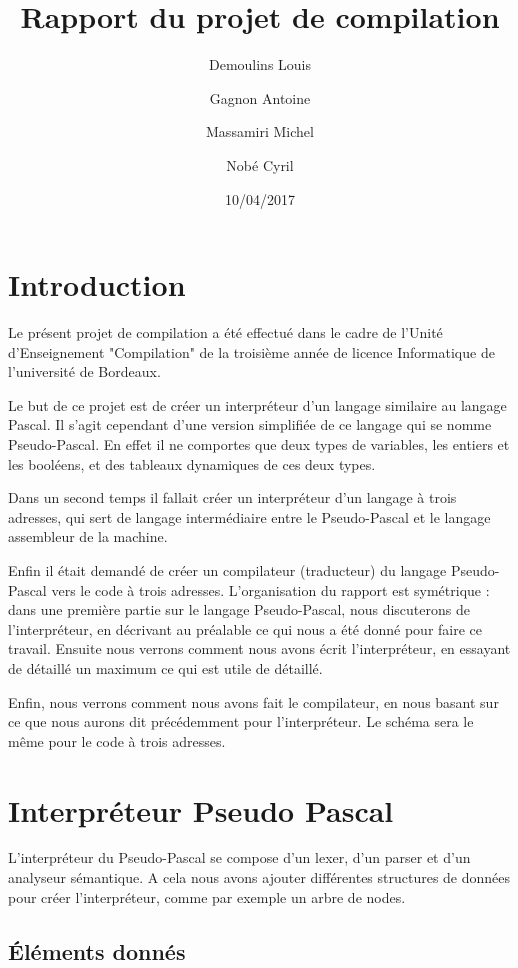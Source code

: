 \documentclass{article}
\title{Rapport du projet de compilation}
\date{10/04/2017}
\author{Demoulins Louis \and Gagnon Antoine \and Massamiri Michel \and Nobé Cyril}
\begin{document}
\maketitle
\newpage

\tableofcontents

\newpage
\section{Introduction}

Le présent projet de compilation a été effectué dans le cadre de l'Unité d'Enseignement "Compilation" de la troisième année de licence Informatique de l'université de Bordeaux.

\medbreak

Le but de ce projet est de créer un interpréteur d'un langage similaire au langage Pascal. Il s'agit cependant d'une version simplifiée de ce langage qui se nomme Pseudo-Pascal.
En effet il ne comportes que deux types de variables, les entiers et les booléens, et des tableaux dynamiques de ces deux types.

Dans un second temps il fallait créer un interpréteur d'un langage à trois adresses, qui sert de langage intermédiaire entre le Pseudo-Pascal et le langage assembleur de la machine.

Enfin il était demandé de créer un compilateur (traducteur) du langage Pseudo-Pascal vers le code à trois adresses.
\bigbreak
L'organisation du rapport est symétrique : dans une première partie sur le langage Pseudo-Pascal, nous discuterons de l'interpréteur, en décrivant au préalable ce qui nous a été donné pour faire ce travail.
Ensuite nous verrons comment nous avons écrit l'interpréteur, en essayant de détaillé un maximum ce qui est utile de détaillé.

Enfin, nous verrons comment nous avons fait le compilateur, en nous basant sur ce que nous aurons dit précédemment pour l'interpréteur.
Le schéma sera le même pour le code à trois adresses.


\newpage
\section{Interpréteur Pseudo Pascal}

L'interpréteur du Pseudo-Pascal se compose d'un lexer, d'un parser et d'un analyseur sémantique. A cela nous avons ajouter différentes structures de données pour créer l'interpréteur, comme par exemple un arbre de nodes.

\subsection{Éléments donnés}
\end{document}
